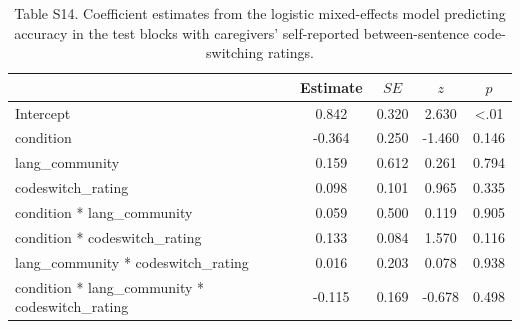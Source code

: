 \documentclass[
  man,floatsintext]{apa7}
\begin{document}
\begin{table}[tbp]

\begin{center}
\begin{threeparttable}

\caption{\label{tab:unnamed-chunk-42}Table S14. Coefficient estimates from the logistic mixed-effects model predicting accuracy in the test blocks with caregivers’ self-reported between-sentence code-switching ratings.}

\begin{tabular}{lcccc}
\toprule
 & Estimate & $SE$ & $z$ & $p$\\
\midrule
Intercept & 0.842 & 0.320 & 2.630 & <.01\\
condition & -0.364 & 0.250 & -1.460 & 0.146\\
lang\_community & 0.159 & 0.612 & 0.261 & 0.794\\
codeswitch\_rating & 0.098 & 0.101 & 0.965 & 0.335\\
condition * lang\_community & 0.059 & 0.500 & 0.119 & 0.905\\
condition * codeswitch\_rating & 0.133 & 0.084 & 1.570 & 0.116\\
lang\_community * codeswitch\_rating & 0.016 & 0.203 & 0.078 & 0.938\\
condition * lang\_community * codeswitch\_rating & -0.115 & 0.169 & -0.678 & 0.498\\
\bottomrule
\end{tabular}

\end{threeparttable}
\end{center}

\end{table}
\end{document}
